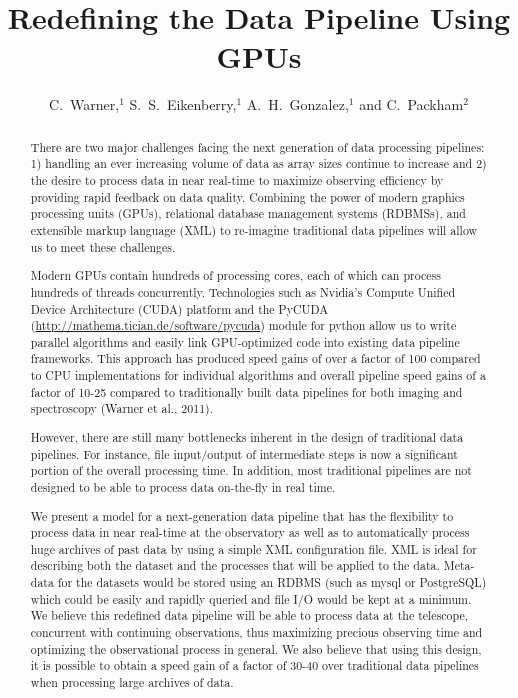 
\resetcounters




\title{Redefining the Data Pipeline Using GPUs}
\author{C.~Warner,$^1$ S.~S.~Eikenberry,$^1$ A.~H.~Gonzalez,$^1$ and C.~Packham$^2$
}


\begin{abstract}
There are two major challenges facing the next generation of data processing pipelines: 1) handling an ever increasing volume of data as array sizes continue to increase and 2) the desire to process data in near real-time to maximize observing efficiency by providing rapid feedback on data quality.  Combining the power of modern graphics processing units (GPUs), relational database management systems (RDBMSs), and extensible markup language (XML) to re-imagine traditional data pipelines will allow us to meet these challenges.

Modern GPUs contain hundreds of processing cores, each of which can process hundreds of threads concurrently.  Technologies such as Nvidia's Compute Unified Device Architecture (CUDA) platform and the PyCUDA (\url{http://mathema.tician.de/software/pycuda}) module for python allow us to write parallel algorithms and easily link GPU-optimized code into existing data pipeline frameworks.  This approach has produced speed gains of over a factor of 100 compared to CPU implementations for individual algorithms and overall pipeline speed gains of a factor of 10-25 compared to traditionally built data pipelines for both imaging and spectroscopy (Warner et al., 2011).

However, there are still many bottlenecks inherent in the design of traditional data pipelines.  For instance, file input/output of intermediate steps is now a significant portion of the overall processing time.  In addition, most traditional pipelines are not designed to be able to process data on-the-fly in real time.

We present a model for a next-generation data pipeline that has the flexibility to process data in near real-time at the observatory as well as to automatically process huge archives of past data by using a simple XML configuration file.  XML is ideal for describing both the dataset and the processes that will be applied to the data.  Meta-data for the datasets would be stored using an RDBMS (such as mysql or PostgreSQL) which could be easily and rapidly queried and file I/O would be kept at a minimum.  We believe this redefined data pipeline will be able to process data at the telescope, concurrent with continuing observations, thus maximizing precious observing time and optimizing the observational process in general.  We also believe that using this design, it is possible to obtain a speed gain of a factor of 30-40 over traditional data pipelines when processing large archives of data.
\end{abstract}

